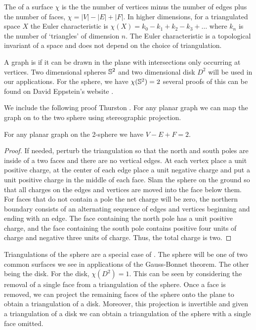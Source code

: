 The  of a surface $\chi$ is the 
the number of vertices minus the number of edges plus  the number of faces, $\chi=|V|-|E|+|F|.$
In higher dimensions, for a triangulated space $X$ the Euler characteristic is 
$\chi(X)=k_0-k_1+k_2-k_3+\ldots$ where $k_n$ is the number of `triangles' of dimension $n.$
The Euler characteristic is a topological invariant of a space
and does not depend on the choice of triangulation.

A  graph  is  if it can be drawn in the plane with intersections only occurring
at vertices.
Two dimensional spheres $\mathbb{S}^2$ and two dimensional disk $D^2$ 
will be used in our applications.
For the sphere, we have $\chi(\mathbb{S}^2)=2$ 
several proofs of this can be found on David Eppstein's website \cite{eppstein-proofs}.




We include the following proof Thurston \cite{thurston}. 
For any planar graph we can map the graph on to the two sphere using stereographic projection.
 

\begin{theorem}\label{thm:euler}
For any planar graph on the 2-sphere we have $V-E+F=2.$
\end{theorem}

\begin{proof}
If needed, perturb the triangulation so that the north and south poles are 
inside of a two faces and there are no vertical edges. At each vertex place a unit positive
charge, at the center of each edge place a unit negative charge and put a unit positive
charge in the middle of each face. Slam the sphere on the ground so that all charges
on the edges and vertices are moved into the face below them. For faces that do not contain a pole
the net charge will be zero, the northern boundary consists of an alternating sequence
of edges and vertices  beginning  and ending with an edge.
The face containing the north pole has a unit positive charge, and the face containing the south
pole contains positive four units of charge and negative three units of charge.
Thus, the total charge is two.

\end{proof}

Triangulations of the sphere are a special case of .
The sphere will be one of two common surfaces we see in applications
of the Gauss-Bonnet theorem. The other being the disk.
For the disk, $\chi(D^2)=1$. This can be seen by considering
the removal of a single face from a triangulation of the sphere.
Once a face is removed, we can project the remaining faces of the sphere
onto the plane to obtain a triangulation of a disk. Moreover, this projection
is invertible and given a triangulation of a disk we can obtain a triangulation
of the sphere with a single face omitted.

